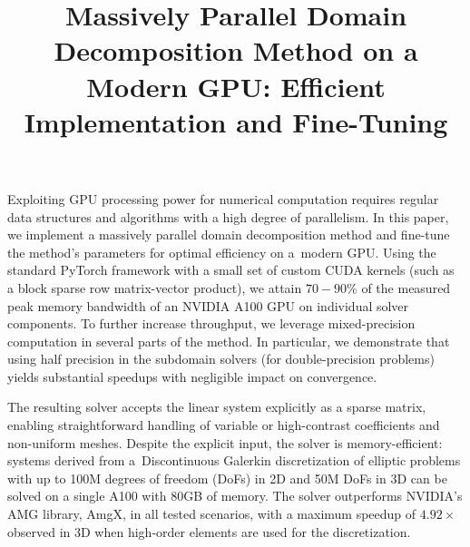 \documentclass[11pt]{article}
\title{
	Massively Parallel Domain Decomposition Method on a Modern GPU: Efficient Implementation and Fine-Tuning
}
\date{}
\begin{document}
\maketitle

Exploiting GPU processing power for numerical computation requires regular data
structures and algorithms with a high degree of parallelism.
In this paper, we implement a massively parallel domain decomposition method \cite{Przykry}
and fine-tune the method's parameters for optimal efficiency on a~modern GPU.
Using the standard PyTorch framework with a small set of custom CUDA kernels
(such as a block sparse row matrix-vector product), we attain $70-90\%$ of the
measured peak memory bandwidth of an NVIDIA A100 GPU on individual solver
components. To further increase throughput, we leverage mixed-precision computation
in several parts of the method. In particular, we demonstrate that using half precision
in the subdomain solvers (for double-precision problems) yields substantial speedups
with negligible impact on convergence.

The resulting solver accepts the linear system explicitly as a sparse matrix, enabling
straightforward handling of variable or high-contrast coefficients and non-uniform meshes.
Despite the explicit input, the solver is memory-efficient: systems derived from
a~Discontinuous Galerkin discretization of elliptic problems with up to 100M degrees
of freedom (DoFs) in 2D and 50M DoFs in 3D can be solved on a single A100 with 80GB of memory.
The solver outperforms NVIDIA's AMG library, AmgX, in all tested scenarios,
with a maximum speedup of $4.92\times$ observed in 3D when high-order elements are used
for the discretization.

\printbibliography
\end{document}
